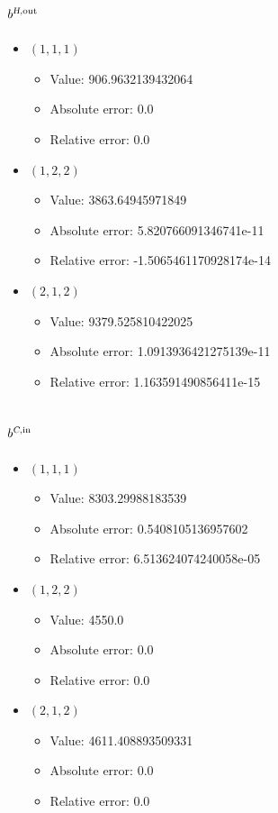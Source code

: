 \documentclass{article}%
\begin{document}
\subsection{$b^{\textsl{H},\text{out}}$}%
\begin{itemize}%
	\item $(1, 1, 1)$%
	\begin{itemize}%
		\item Value: 906.9632139432064%
		\item Absolute error: 0.0%
		\item Relative error: 0.0%
	\end{itemize}%
	\item $(1, 2, 2)$%
	\begin{itemize}%
		\item Value: 3863.64945971849%
		\item Absolute error: 5.820766091346741e-11%
		\item Relative error: -1.5065461170928174e-14%
	\end{itemize}%
	\item $(2, 1, 2)$%
	\begin{itemize}%
		\item Value: 9379.525810422025%
		\item Absolute error: 1.0913936421275139e-11%
		\item Relative error: 1.163591490856411e-15%
	\end{itemize}%
\end{itemize}%
\subsection{$b^{\textsl{C},\text{in}}$}%
\begin{itemize}%
	\item $(1, 1, 1)$%
	\begin{itemize}%
		\item Value: 8303.29988183539%
		\item Absolute error: 0.5408105136957602%
		\item Relative error: 6.513624074240058e-05%
	\end{itemize}%
	\item $(1, 2, 2)$%
	\begin{itemize}%
		\item Value: 4550.0%
		\item Absolute error: 0.0%
		\item Relative error: 0.0%
	\end{itemize}%
	\item $(2, 1, 2)$%
	\begin{itemize}%
		\item Value: 4611.408893509331%
		\item Absolute error: 0.0%
		\item Relative error: 0.0%
	\end{itemize}%
\end{itemize}%
\end{document}
